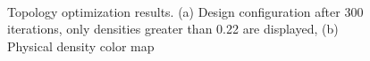   \begin{figure}[hbt!]
             \centering
                           \\
                  \caption{Topology optimization results. (a) Design configuration after 300 iterations, only densities greater than 0.22 are displayed, (b) Physical density color map \label{fig2.10}} 
                \end{figure}
